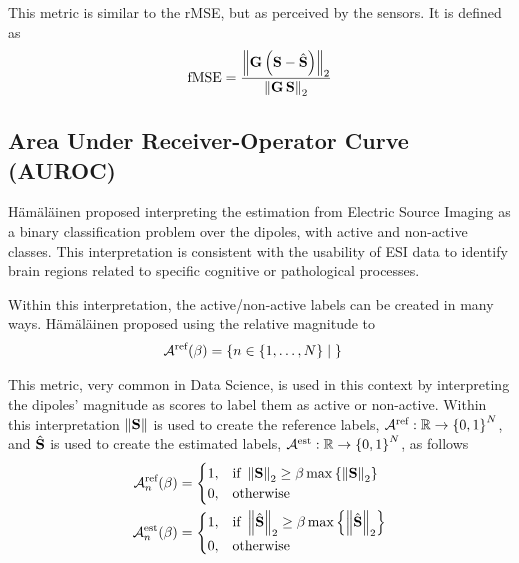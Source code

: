 This metric is similar to the rMSE, but as perceived by the sensors.
%
It is defined as
\begin{equation}
\text{fMSE} = 
\frac{\left\lVert \mathbf{G}\left( \mathbf{S} - \hat{\mathbf{S}} \right) \right\rVert_2}{\left\lVert \mathbf{G}\, \mathbf{S} \right\rVert_2}
\end{equation}

\subsection{Area Under Receiver-Operator Curve (AUROC)}

H\"{a}m\"{a}l\"{a}inen proposed interpreting the estimation from Electric Source Imaging as a binary classification problem over the dipoles, with active and non-active classes.
%
This interpretation is consistent with the usability of ESI data to identify brain regions related to specific cognitive or pathological processes.

Within this interpretation, the active/non-active labels can be created in many ways. 
%
H\"{a}m\"{a}l\"{a}inen proposed using the relative magnitude to 
\begin{align}
\mathcal{A}^{\text{ref}}(\beta)
&=
\left\{ n\in\left\{ 1, \dots, N \right\} \;\middle|\;   \right\}
\end{align}

This metric, very common in Data Science, is used in this context by interpreting the dipoles' magnitude as scores to label them as active or non-active.
%
Within this interpretation $\left\lVert \mathbf{S} \right\rVert$ is used to create the reference labels, $\mathcal{A}^{\text{ref}}: \mathbb{R} \rightarrow \left\{ 0,1 \right\}^N$, and $\hat{\mathbf{S}}$ is used to create the estimated labels, $\mathcal{A}^{\text{est}}: \mathbb{R} \rightarrow \left\{ 0,1 \right\}^N$, as follows
\begin{align}
\mathcal{A}_n^{\text{ref}}(\beta)
&=
\begin{cases}
1, &\text{if }
\left\lVert \mathbf{S} \right\rVert_2 \geq \beta \max\left\{ \left\lVert \mathbf{S} \right\rVert_2 \right\}
\\
0, &\text{otherwise}
\end{cases}
\\
\mathcal{A}_n^{\text{est}}(\beta)
&=
\begin{cases}
1, &\text{if }
\left\lVert \hat{\mathbf{S}} \right\rVert_2 \geq \beta \max\left\{ \left\lVert \hat{\mathbf{S}} \right\rVert_2 \right\}
\\
0, &\text{otherwise}
\end{cases}
\end{align}


